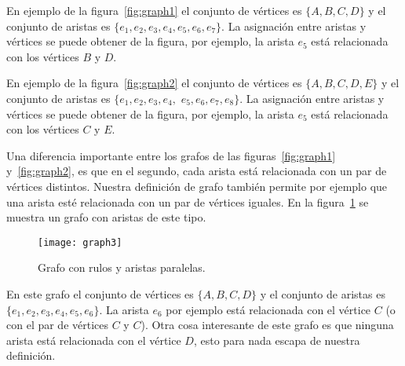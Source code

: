 \begin{ejemplo}
En ejemplo de la figura~\ref{fig:graph1} el conjunto de vértices es $\{A,B,C,D\}$ y el conjunto de aristas es $\{e_1,e_2,e_3,e_4,e_5,e_6,e_7\}$.
La asignación entre aristas y vértices se puede obtener de la figura, por ejemplo, la arista $e_5$ está relacionada con los vértices $B$ y $D$.

En ejemplo de la figura~\ref{fig:graph2} el conjunto de vértices es $\{A,B,C,D,E\}$ y el conjunto de aristas es $\{e_1,e_2,e_3,e_4,$ $e_5,e_6,e_7,e_8\}$.
La asignación entre aristas y vértices se puede obtener de la figura, por ejemplo, la arista $e_5$ está relacionada con los vértices $C$ y $E$.

Una diferencia importante entre los grafos de las figuras~\ref{fig:graph1} y~\ref{fig:graph2}, es que en el segundo, cada arista está relacionada con un par de vértices distintos.
Nuestra definición de grafo también permite por ejemplo que una arista esté relacionada con un par de vértices iguales.
En la figura~\ref{fig:graph3} se muestra un grafo con aristas de este tipo.
\begin{figure}[h!]
\centering
\texttt{[image: graph3]}
\caption{Grafo con rulos y aristas paralelas.}
\label{fig:graph3}
\end{figure}
En este grafo el conjunto de vértices es $\{A,B,C,D\}$ y el conjunto de aristas es $\{e_1,e_2,e_3,e_4,e_5,e_6\}$. 
La arista $e_6$ por ejemplo está relacionada con el vértice $C$ (o con el par de vértices $C$ y $C$).
Otra cosa interesante de este grafo es que ninguna arista está relacionada con el vértice $D$, esto para nada escapa de nuestra definición. 
\end{ejemplo}

